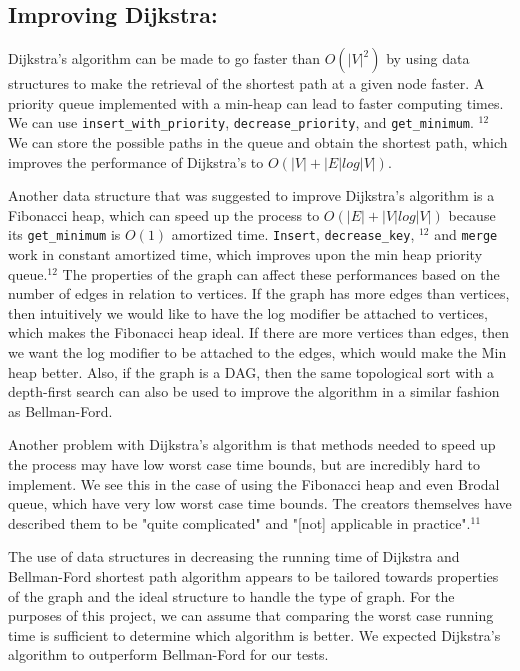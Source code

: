 \documentclass{article}
\begin{document}
\subsection{Improving Dijkstra:}
Dijkstra's algorithm can be made to go faster than $O(|V|^2)$ by using data structures to make the retrieval of the shortest path at a given node faster. A priority queue implemented with a min-heap can lead to faster computing times. We can use \texttt{insert\_with\_priority}, \texttt{decrease\_priority}, and \texttt{get\_minimum}. $^{12}$ We can store the possible paths in the queue and obtain the shortest path, which improves the performance of Dijkstra's to $O(|V|+|E|log |V|)$. 
	
	
Another data structure that was suggested to improve Dijkstra's algorithm is a Fibonacci heap, which can speed up the process to $O(|E| + |V| log |V|)$ because its \texttt{get\_minimum} is $O(1)$ amortized time. \texttt{Insert}, \texttt{decrease\_key}, $^{12}$ and \texttt{merge} work in constant amortized time, which improves upon the min heap priority queue.$^{12}$ The properties of the graph can affect these performances based on the number of edges in relation to vertices. If the graph has more edges than vertices, then intuitively we would like to have the log modifier be attached to vertices, which makes the Fibonacci heap ideal. If there are more vertices than edges, then we want the log modifier to be attached to the edges, which would make the Min heap better. Also, if the graph is a DAG, then the same topological sort with a depth-first search can also be used to improve the algorithm in a similar fashion as Bellman-Ford. 


Another problem with Dijkstra's algorithm is that methods needed to speed up the process may have low worst case time bounds, but are incredibly hard to implement. We see this in the case of using the Fibonacci heap and even Brodal queue, which have very low worst case time bounds.  The creators themselves have described them to be "quite complicated" and "[not] applicable in practice".$^{11}$


The use of data structures in decreasing the running time of Dijkstra and Bellman-Ford shortest path algorithm appears to be tailored towards properties of the graph and the ideal structure to handle the type of graph. For the purposes of this project, we can assume that comparing the worst case running time is sufficient to determine which algorithm is better. We expected Dijkstra's algorithm to outperform Bellman-Ford for our tests.
\end{document}
